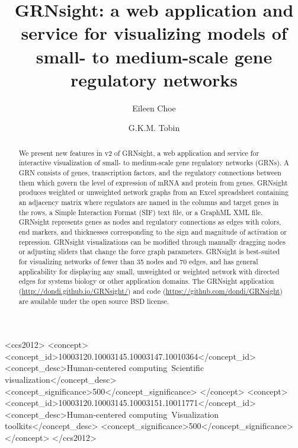\documentclass[sigconf,review,anonymous]{acmart}
\begin{document}
\title{GRNsight: a web application and service for visualizing models of small- to medium-scale gene regulatory networks}

\author{Eileen Choe}

\author{G.K.M. Tobin}

\renewcommand{\shortauthors}{B. Trovato et. al.}

\begin{abstract}

We present new features in v2 of GRNsight, a web application and service for interactive visualization of small- to medium-scale gene regulatory networks (GRNs). A GRN consists of genes, transcription factors, and the regulatory connections between them which govern the level of expression of mRNA and protein from genes. GRNsight produces weighted or unweighted network graphs from an Excel spreadsheet containing an adjacency matrix where regulators are named in the columns and target genes in the rows, a Simple Interaction Format (SIF) text file, or a GraphML XML file. GRNsight represents genes as nodes and regulatory connections as edges with colors, end markers, and thicknesses corresponding to the sign and magnitude of activation or repression. GRNsight visualizations can be modified through manually dragging nodes or adjusting sliders that change the force graph parameters. GRNsight is best-suited for visualizing networks of fewer than 35 nodes and 70 edges, and has general applicability for displaying any small, unweighted or weighted network with directed edges for systems biology or other application domains. The GRNsight application (\url{http://dondi.github.io/GRNsight/}) and code (\url{https://github.com/dondi/GRNsight}) are available under the open source BSD license.

\end{abstract}

%
%
\begin{CCSXML}
<ccs2012>
<concept>
<concept_id>10003120.10003145.10003147.10010364</concept_id>
<concept_desc>Human-centered computing~Scientific visualization</concept_desc>
<concept_significance>500</concept_significance>
</concept>
<concept>
<concept_id>10003120.10003145.10003151.10011771</concept_id>
<concept_desc>Human-centered computing~Visualization toolkits</concept_desc>
<concept_significance>500</concept_significance>
</concept>
</ccs2012>
\end{CCSXML}
\end{document}
